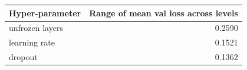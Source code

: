 \begin{tabular}{lr}
\toprule
\textbf{Hyper-parameter} & \textbf{Range of mean val loss across levels} \\
\midrule
unfrozen layers & 0.2590 \\
learning rate & 0.1521 \\
dropout & 0.1362 \\
\bottomrule
\end{tabular}
